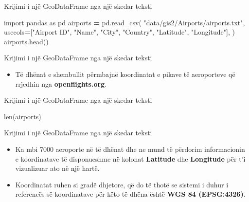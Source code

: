 \documentclass[
  ignorenonframetext,
]{beamer}
\newenvironment{Shaded}{\begin{snugshade}}{\end{snugshade}}
\newcommand{\BuiltInTok}[1]{#1}
\newcommand{\ImportTok}[1]{#1}
\newcommand{\NormalTok}[1]{#1}
\newcommand{\OperatorTok}[1]{\textcolor[rgb]{0.81,0.36,0.00}{\textbf{#1}}}
\newcommand{\StringTok}[1]{\textcolor[rgb]{0.31,0.60,0.02}{#1}}
\providecommand{\tightlist}{%
  \setlength{\itemsep}{0pt}\setlength{\parskip}{0pt}}
\begin{document}
\begin{frame}[fragile]{Krijimi i një GeoDataFrame nga një skedar teksti}
\protect\hypertarget{krijimi-i-njuxeb-geodataframe-nga-njuxeb-skedar-teksti-1}{}

\begin{Shaded}
\begin{Highlighting}[]
\ImportTok{import}\NormalTok{ pandas }\ImportTok{as}\NormalTok{ pd}
\NormalTok{airports }\OperatorTok{=}\NormalTok{ pd.read\_csv(}
    \StringTok{"data/gis2/Airports/airports.txt"}\NormalTok{,}
\NormalTok{    usecols}\OperatorTok{=}\NormalTok{[}\StringTok{"Airport ID"}\NormalTok{, }\StringTok{"Name"}\NormalTok{, }\StringTok{"City"}\NormalTok{, }\StringTok{"Country"}\NormalTok{, }\StringTok{"Latitude"}\NormalTok{, }\StringTok{"Longitude"}\NormalTok{],}
\NormalTok{)}
\NormalTok{airports.head()}
\end{Highlighting}
\end{Shaded}
\end{frame}

\begin{frame}{Krijimi i një GeoDataFrame nga një skedar teksti}
\protect\hypertarget{krijimi-i-njuxeb-geodataframe-nga-njuxeb-skedar-teksti-2}{}
\begin{itemize}
\tightlist
\item
  Të dhënat e shembullit përmbajnë koordinatat e pikave të aeroporteve
  që rrjedhin nga \textbf{openflights.org}.
\end{itemize}
\end{frame}

\begin{frame}[fragile]{Krijimi i një GeoDataFrame nga një skedar teksti}
\protect\hypertarget{krijimi-i-njuxeb-geodataframe-nga-njuxeb-skedar-teksti-3}{}

\begin{Shaded}
\begin{Highlighting}[]
\BuiltInTok{len}\NormalTok{(airports)}
\end{Highlighting}
\end{Shaded}
\end{frame}

\begin{frame}{Krijimi i një GeoDataFrame nga një skedar teksti}
\protect\hypertarget{krijimi-i-njuxeb-geodataframe-nga-njuxeb-skedar-teksti-4}{}
\begin{itemize}
\item
  Ka mbi 7000 aeroporte në të dhënat dhe ne mund të përdorim
  informacionin e koordinatave të disponueshme në kolonat
  \textbf{Latitude} dhe \textbf{Longitude} për t'i vizualizuar ato në
  një hartë.
\item
  Koordinatat ruhen si gradë dhjetore, që do të thotë se sistemi i duhur
  i referencës së koordinatave për këto të dhëna është \textbf{WGS 84
  (EPSG:4326)}.
\end{itemize}
\end{frame}
\end{document}
